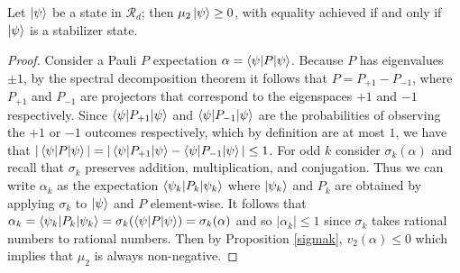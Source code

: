 \documentclass[12pt]{dalthesis}
\begin{document}
\begin{proposition}
Let $\ket{\psi}$ be a state in $\mathcal{R}_d$; then $\mu_2\ket{\psi} \geq 0$, with equality achieved if and only if $\ket{\psi}$ is a stabilizer state. 
\end{proposition}
\begin{proof}
Consider a Pauli $P$ expectation $\alpha = \braket{\psi |P| \psi}$. Because $P$ has eigenvalues $\pm 1$, by the spectral decomposition theorem it follows that $P= P_{+1} - P_{-1}$, where $P_{+1}$ and $P_{-1}$ are projectors that correspond to the eigenspaces $+1$ and $-1$ respectively. Since $\braket{\psi |P_{+1}| \psi}$ and $\braket{\psi |P_{-1}| \psi}$ are the probabilities of observing the $+ 1$ or $-1$ outcomes respectively, which by definition are at most $1$, we have that $|\braket{\psi |P| \psi}| = |\braket{\psi |P_{+1}| \psi} - \braket{\psi |P_{-1}| \psi}| \leq 1$. For odd $k$ consider $\sigma_k(\alpha)$ and recall that $\sigma_k$ preserves addition, multiplication, and conjugation. Thus we can write $\alpha_k$ as the expectation $\braket{\psi_k |P_k| \psi_k}$ where $\ket{\psi_k}$ and $P_k$ are obtained by applying $\sigma_k$ to $\ket{\psi}$ and $P$ element-wise. It follows that $\alpha_k = \braket{\psi_k |P_k| \psi_k} = \sigma_k (\braket{\psi |P| \psi}) = \sigma_k (\alpha)$ and so $|\alpha_k| \leq 1$ since $\sigma_k$ takes rational numbers to rational numbers. Then by Proposition \ref{sigmak}, $v_2(\alpha) \leq 0$ which implies that $\mu_2$ is always non-negative. 


\end{proof}
\end{document}
